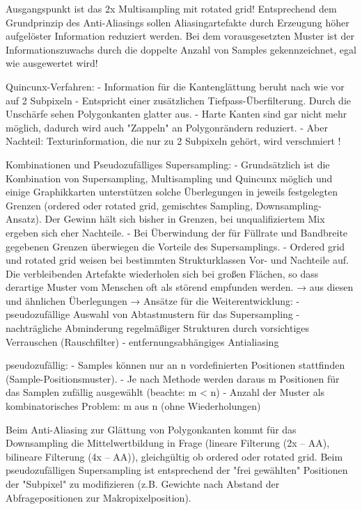 \documentclass[10pt,landscape]{article}
\begin{document}
\begin{multicols}{3}
Ausgangspunkt ist das 2x Multisampling mit rotated grid! Entsprechend dem Grundprinzip des Anti-Aliasings sollen Aliasingartefakte durch Erzeugung höher aufgelöster Information reduziert werden. Bei dem vorausgesetzten Muster ist der Informationszuwachs durch die doppelte Anzahl von Samples gekennzeichnet, egal wie ausgewertet wird!

Quincunx-Verfahren:
- Information für die Kantenglättung beruht nach wie vor auf 2 Subpixeln
- Entspricht einer zusätzlichen Tiefpass-Überfilterung. Durch die Unschärfe sehen Polygonkanten glatter aus.
- Harte Kanten sind gar nicht mehr möglich, dadurch wird auch "Zappeln" an Polygonrändern reduziert.
- Aber Nachteil: Texturinformation, die nur zu 2 Subpixeln gehört, wird verschmiert !

Kombinationen und Pseudozufälliges Supersampling:
- Grundsätzlich ist die Kombination von Supersampling, Multisampling und Quincunx möglich und einige Graphikkarten unterstützen solche Überlegungen in jeweils festgelegten Grenzen (ordered oder rotated grid, gemischtes Sampling, Downsampling-Ansatz). Der Gewinn hält sich bisher in Grenzen, bei unqualifiziertem Mix ergeben sich eher Nachteile.
- Bei Überwindung der für Füllrate und Bandbreite gegebenen Grenzen überwiegen die Vorteile des Supersamplings.
- Ordered grid und rotated grid weisen bei bestimmten Strukturklassen Vor- und Nachteile auf. Die verbleibenden Artefakte wiederholen sich bei großen Flächen, so dass derartige Muster vom Menschen oft als störend empfunden werden. → aus diesen und ähnlichen Überlegungen → Ansätze für die Weiterentwicklung:
    - pseudozufällige Auswahl von Abtastmustern für das Supersampling
    - nachträgliche Abminderung regelmäßiger Strukturen durch vorsichtiges Verrauschen (Rauschfilter)
    - entfernungsabhängiges Antialiasing

pseudozufällig:
- Samples können nur an n vordefinierten Positionen stattfinden (Sample-Positionsmuster).
- Je nach Methode werden daraus m Positionen für das Samplen zufällig ausgewählt (beachte: m < n)
- Anzahl der Muster als kombinatorisches Problem: m aus n (ohne Wiederholungen)

Beim Anti-Aliasing zur Glättung von Polygonkanten kommt für das Downsampling die Mittelwertbildung in Frage (lineare Filterung (2x – AA), bilineare Filterung (4x – AA)), gleichgültig ob ordered oder rotated grid. Beim pseudozufälligen Supersampling ist entsprechend der "frei gewählten" Positionen der "Subpixel" zu modifizieren (z.B. Gewichte nach Abstand der Abfragepositionen zur Makropixelposition).



\end{multicols}
\end{document}
